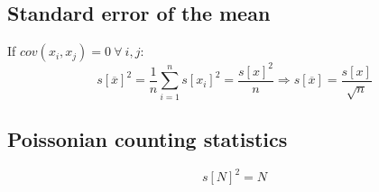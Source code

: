 \documentclass{article}
\begin{document}
\begin{multicols}{3}
\begin{enumerate}
\end{enumerate}

\subsection{Standard error of the mean}

If $cov(x_i,x_j)=0 ~\forall~ i, j$:
\begin{equation}
s[\overline{x}]^2 = \frac{1}{n} \sum_{i=1}^{n} s[x_i]^2 =
\frac{s[x]^2}{n} \Rightarrow s[\overline{x}] = \frac{s[x]}{\sqrt{n}}
\label{eq:varianceofthemean}
\end{equation}

\subsection{Poissonian counting statistics}

\begin{equation}
  s[N]^2 = N
\end{equation}

\end{multicols}
\end{document}
